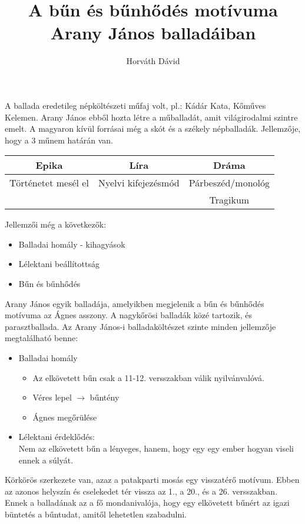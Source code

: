 \documentclass[]{article}
\title{A bűn és bűnhődés motívuma Arany János balladáiban}
\author{Horváth Dávid}
\begin{document}
	
	\maketitle
	
	A ballada eredetileg népköltészeti műfaj volt, pl.: Kádár Kata, Kőműves Kelemen. Arany János ebből hozta létre a műballadát, amit világirodalmi szintre emelt. A magyaron kívül forrásai még a skót és a székely népballadák. Jellemzője, hogy a 3 műnem határán van.
	\begin{center}
		
		\begin{tabular}{|c|c|c|}
			\hline
			Epika&Líra&Dráma\\\hline
			Történetet mesél el&Nyelvi kifejezésmód&Párbeszéd/monológ\\\hline
			&&Tragikum\\\hline
		\end{tabular}
	\end{center}
	Jellemzői még a következők:
	\begin{itemize}
		\item Balladai homály - kihagyások
		\item Lélektani beállítottság
		\item Bűn és bűnhődés
	\end{itemize}

	Arany János egyik balladája, amelyikben megjelenik a bűn és bűnhődés motívuma az Ágnes asszony. A nagykőrösi balladák közé tartozik, és parasztballada. Az Arany János-i balladaköltészet szinte minden jellemzője megtalálható benne:
	\begin{itemize}
		\item Balladai homály
		\begin{itemize}
			\item Az elkövetett bűn csak a 11-12. versszakban válik nyilvánvalóvá.
			\item Véres lepel $\rightarrow$ bűntény
			\item Ágnes megőrülése
		\end{itemize}
		\item Lélektani érdeklődés:\\
		Nem az elkövetett bűn a lényeges, hanem, hogy egy egy ember hogyan viseli ennek a súlyát.
	\end{itemize}
	Körkörös szerkezete van, azaz a patakparti mosás egy visszatérő motívum. Ebben az azonos helyszín és cselekedet tér vissza az 1., a 20., és a 26. versszakban. Ennek a balladának az a fő mondanivalója, hogy egy elkövetett bűnért az igazi büntetés a bűntudat, amitől lehetetlen szabadulni.
\end{document}
